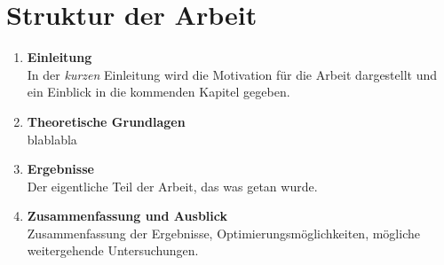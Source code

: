 \chapter{Struktur der Arbeit}

\begin{enumerate}
    \item \textbf{Einleitung}\\
        In der \emph{kurzen} Einleitung wird die Motivation für die Arbeit
        dargestellt und ein Einblick in die kommenden Kapitel gegeben.
    \item \textbf{Theoretische Grundlagen}\\
        blablabla
    \item \textbf{Ergebnisse} \\
        Der eigentliche Teil der Arbeit, das was getan wurde.
    \item \textbf{Zusammenfassung und Ausblick} \\
        Zusammenfassung der Ergebnisse, Optimierungsmöglichkeiten, mögliche weitergehende Untersuchungen.
\end{enumerate}

%
%
%
